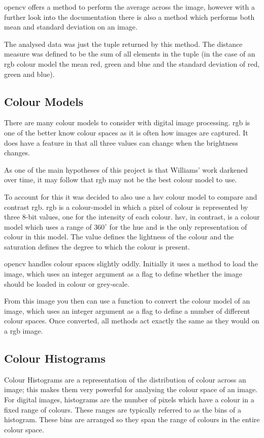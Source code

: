 \gls{opencv} offers a method to perform the average across the image, however with a
further look into the documentation there is also a method which performs both 
mean and standard deviation on an image.

The analysed data was just the tuple returned by this method. The distance measure
was defined to be the sum of all elements in the tuple (in the case of an \gls{rgb} colour model
the mean red, green and blue and the standard deviation of red, green and blue).

\subsection{Colour Models}
There are many colour models to consider with digital image processing. \Gls{rgb} is one of the
better know colour spaces as it is often how images are captured. It does have a feature in that
all three values can change when the brightness changes.

As one of the main hypotheses of this project is that Williams' work darkened over time, it
may follow that \gls{rgb} may not be the best colour model to use.

To account for this it was decided to also use a \gls{hsv} colour model to compare and contrast 
\gls{rgb}. \Gls{rgb} is a colour-model in which a pixel of colour is represented by three 8-bit
values, one for the intensity of each colour. \Gls{hsv}, in contrast, is a colour model which uses
a range of $360^\circ$ for the hue and is the only representation of colour in this model. The 
value defines the lightness of the colour and the saturation defines the degree to which the 
colour is present.

\gls{opencv} handles colour spaces slightly oddly. Initially it uses a method to load the 
image, which uses an integer argument as a flag to define whether the image should be loaded in 
colour or grey-scale.

From this image you then can use a function to convert the colour model of an image, which 
uses an integer argument as a flag to define a number of different colour spaces.
Once converted, all methods act exactly the same as they would on a \gls{rgb} image.


\subsection{Colour Histograms}
Colour Histograms are a representation of the distribution of colour across an image; this makes
them very powerful for analysing the colour space of an image. For digital images, histograms are
the number of pixels which have a colour in a fixed range of colours. These ranges are typically
referred to as the bins of a histogram. These bins are arranged so they span the range of colours
in the entire colour space.

